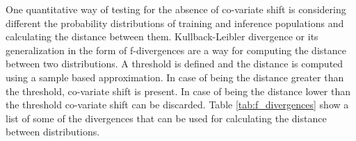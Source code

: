 One quantitative way of testing for the absence of co-variate shift is considering different the probability distributions of training and inference populations and calculating the distance between them. Kullback-Leibler divergence or its generalization in the form of f-divergences \citep{ali1966general} are a way for computing the distance between two distributions. A threshold is defined and the distance is computed using a sample based approximation. In case of being the distance greater than the threshold, co-variate shift is present. In case of being the distance lower than the threshold co-variate shift can be discarded. Table \ref{tab:f_divergences} show a list of some of the divergences that can be used for calculating the distance between distributions.

\begin{table}[h!]
	\centering
	\caption[Summary of f-divergences]{Summary of f-divergences available for measuring the distance between two probability distributions $P$ and $Q$ }
	\label{tab:f_divergences}
\end{table}

